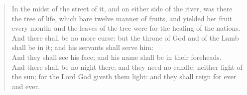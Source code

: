 \documentclass[MAIN]{subfiles}
\begin{document}
\begin{verse}
In the midst of the street of it, and on either side of the river, was there the tree of life, which bare twelve manner of fruits, and yielded her fruit every month: and the leaves of the tree were for the healing of the nations.\\
And there shall be no more curse: but the throne of God and of the Lamb shall be in it; and his servants shall serve him:\\
And they shall see his face; and his name shall be in their foreheads.\\
And there shall be no night there; and they need no candle, neither light of the sun; for the Lord God giveth them light: and they shall reign for ever and ever.
\end{verse}
\end{document}
